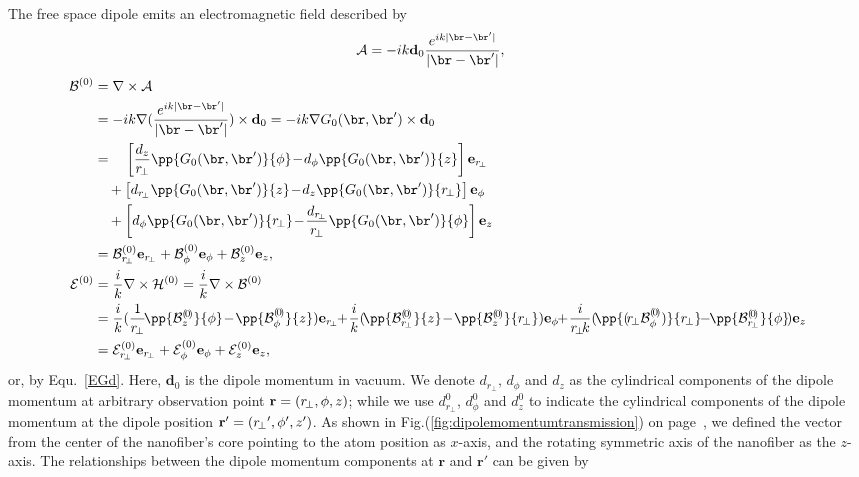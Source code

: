 \documentclass[]{report}
\begin{document}
The free space dipole emits an electromagnetic field described by
\begin{align}
\mathcal{A} &= -ik \mathbf{d}_0 \frac{e^{ik|\br-\br'|}}{|\br-\br'|},
\end{align}
\begin{align}
\mathcal{B}^{(0)} &= \nabla\times \mathcal{A}\nonumber \\
&=-ik\nabla(\frac{e^{ik|\br-\br'|}}{|\br-\br'|})\times\mathbf{d}_0=-ik\nabla G_0(\br,\br')\times\mathbf{d}_0\nonumber\\
&=\quad\left[\frac{d_z}{r\!_\perp}\pp{G_0(\br,\br')}{\phi}\!-\! d_\phi\pp{G_0(\br,\br')}{z}\right]\mathbf{e}_{r\!_{\perp}}\nonumber\\
&\quad+\left[d_{r\!_\perp}\pp{G_0(\br,\br')}{z}\!-\!d_z\pp{G_0(\br,\br')}{r\!_\perp} \right]\mathbf{e}_\phi \nonumber\\
&\quad+ \left[d_\phi\pp{G_0(\br,\br')}{r\!_\perp}\!-\! \frac{d_{r\!_\perp}}{r\!_\perp}\pp{G_0(\br,\br')}{\phi} \right]\mathbf{e}_z\\
&=\mathcal{B}^{(0)}_{r\!_\perp}\mathbf{e}_{r\!_{\perp}} +\mathcal{B}^{(0)}_\phi\mathbf{e}_\phi + \mathcal{B}^{(0)}_z\mathbf{e}_z,\\
\mathcal{E}^{(0)} &= \frac{i}{k} \nabla\times \mathcal{H}^{(0)}=\frac{i}{k}\nabla\times \mathcal{B}^{(0)}\nonumber\\
&=\frac{i}{k}(\frac{1}{r\!_\perp}\!\pp{\mathcal{B}^{(\!0\!)}_z}{\phi}\!-\! \pp{\mathcal{B}^{(\!0\!)}_\phi}{z})\mathbf{e}_{r\!_{\perp}} \!\!+\! \frac{i}{k}(\!\pp{\mathcal{B}^{(\!0\!)}_{r\!_\perp}}{z} \!-\! \pp{\mathcal{B}^{(\!0\!)}_z}{r\!_\perp})\mathbf{e}_\phi \!\!+\! \frac{i}{r\!_\perp\! k} (\!\pp{(\! r\!_\perp \mathcal{B}^{(\!0\!)}_\phi)}{r\!_\perp} \!\!-\!\! \pp{\mathcal{B}^{(\!0\!)}_{r\!_\perp}}{\phi}\! )\mathbf{e}_z\\
&=\mathcal{E}^{(0)}_{r\!_\perp}\mathbf{e}_{r\!_{\perp}} +\mathcal{E}^{(0)}_\phi\mathbf{e}_\phi + \mathcal{E}^{(0)}_z\mathbf{e}_z,
\end{align}
or, by Equ.~\eqref{EGd}. Here, $ \mathbf{d}_0 $ is the dipole momentum in vacuum. We denote $d_{r\!_\perp},\, d_\phi$ and $d_z$ as the cylindrical components of the dipole momentum at arbitrary observation point ${\rm {\bf r}}=\left( {r\!_\perp ,\phi ,z}\right) $; while we use $d^0_{r\!_\perp}$, $d^0_\phi$ and $d^0_z$ to indicate the cylindrical components of the dipole momentum at the dipole position ${\rm 
{\bf {r}^{\prime }}}=\left( {{r\!_\perp }^{\prime },{\phi }^{\prime },{z}^{\prime }}\right) $. As shown in Fig.(\ref{fig:dipolemomentumtransmission}) on page~\pageref{fig:dipolemomentumtransmission}, we defined the vector from the center of the nanofiber's core pointing to the atom position as $x$-axis, and the rotating symmetric axis of the nanofiber as the $z$-axis. The relationships between the dipole momentum components at $\mathbf{r}$ and $\mathbf{r}'$ can be given by
\end{document}
